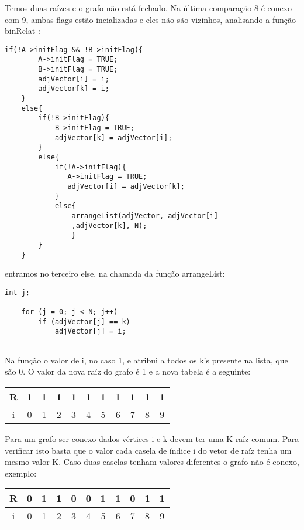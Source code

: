 \documentclass[a4paper,11pt]{article}
\begin{document}
Temos duas raízes e o grafo não está fechado. Na última comparação 8 é conexo com 9, ambas flags estão incializadas e eles não são vizinhos, analisando a função binRelat :
 \begin{lstlisting}[frame=single]
    if(!A->initFlag && !B->initFlag){
        A->initFlag = TRUE;
        B->initFlag = TRUE;
        adjVector[i] = i;
        adjVector[k] = i;
    }
    else{
        if(!B->initFlag){
            B->initFlag = TRUE;
            adjVector[k] = adjVector[i];
        }
        else{
            if(!A->initFlag){
               A->initFlag = TRUE;
               adjVector[i] = adjVector[k];
            }
            else{
                arrangeList(adjVector, adjVector[i]
                ,adjVector[k], N);
                }
        }
    }

\end{lstlisting}


entramos no terceiro else, na chamada da função arrangeList:
 \begin{lstlisting}[frame=single]
     int j;

    for (j = 0; j < N; j++)
        if (adjVector[j] == k)
            adjVector[j] = i;
            

\end{lstlisting}

Na função o valor de i, no caso 1, e atribui a todos os k's presente na lista, que são 0. O valor da nova raíz do grafo é 1 e a nova tabela é a seguinte: 

\begin{table}[ht]
\centering
\begin{tabular}{c |c | c |c |c |c |c |c |c |c |c }
R & 1 & 1 & 1 & 1 & 1 & 1 & 1 & 1 & 1 & 1\\ \hline \hline
i & 0 & 1 & 2 & 3 & 4 & 5 & 6 & 7 & 8 & 9 
\end{tabular}
\end{table}

Para um grafo ser conexo dados vértices i e k devem ter uma K raíz comum. Para verificar isto basta que o valor cada casela de índice i do vetor de raíz tenha um mesmo valor K. Caso duas caselas tenham valores diferentes o grafo não é conexo, exemplo:

\begin{table}[ht]
\centering
\begin{tabular}{c |c | c |c |c |c |c |c |c |c |c }
R & 0 & 1 & 1 & 0 & 0 & 1 & 1 & 0 & 1 & 1\\ \hline \hline
i & 0 & 1 & 2 & 3 & 4 & 5 & 6 & 7 & 8 & 9 
\end{tabular}
\end{table}
\end{document}
